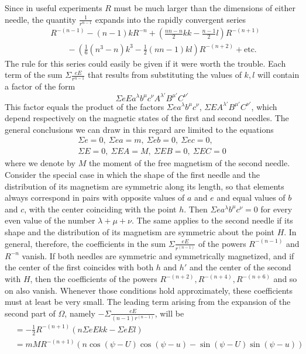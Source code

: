 Since in useful experiments $R$ must be much larger than the dimensions of either needle, the quantity $\frac1{r^{n-1}}$ expands into the rapidly convergent series
\[
\begin{aligned}
&R^{-(n-1)}-(n-1)kR^{-n}+\left(\frac{nn-n}{2}kk-\frac{n-1}{2}l\right)R^{-(n+1)}\\
&\qquad-\left(\tfrac16(n^3-n)k^3-\tfrac12(nn-1)kl\right)R^{-(n+2)}+\text{etc.}
\end{aligned}
\]
The rule for this series could easily be given if it were worth the trouble. Each term of the sum $\Sigma\frac{eE}{r^{n-1}}$ that results from substituting the values of $k,l$ will contain a factor of the form
\[
\Sigma eEa^\lambda b^\mu c^\nu A^{\lambda'}B^{\mu'}C^{\nu'}
\]
This factor equals the product of the factors $\Sigma ea^\lambda b^\mu c^\nu$, $\Sigma EA^{\lambda'}B^{\mu'}C^{\nu'}$, which depend respectively on the magnetic states of the first and second needles. The general conclusions we can draw in this regard are limited to the equations
\[
\begin{gathered}
\Sigma e=0,\ \Sigma ea=m,\ \Sigma eb=0,\ \Sigma ec=0,\\
\Sigma E=0,\ \Sigma EA=M,\ \Sigma EB=0,\ \Sigma EC=0
\end{gathered}
\]
where we denote by $M$ the moment of the free magnetism of the second needle. Consider the special case in which the shape of the first needle and the distribution of its magnetism are symmetric along its length, so that elements always correspond in pairs with opposite values of $a$ and $e$ and equal values of $b$ and $c$, with the center coinciding with the point $h$. Then $\Sigma ea^\lambda b^\mu c^\nu=0$ for every even value of the number $\lambda+\mu+\nu$. The same applies to the second needle if its shape and the distribution of its magnetism are symmetric about the point $H$. In general, therefore, the coefficients in the sum $\Sigma\frac{eE}{r^{(n-1)}}$ of the powers $R^{-(n-1)}$ and $R^{-n}$ vanish. If both needles are symmetric and symmetrically magnetized, and if the center of the first coincides with both $h$ and $h'$ and the center of the second with $H$, then the coefficients of the powers $R^{-(n+2)},R^{-(n+4)},R^{-(n+6)}$ and so on also vanish. Whenever those conditions hold approximately, these coefficients must at least be very small. The leading term arising from the expansion of the second part of $\Omega$, namely $-\Sigma\frac{eE}{(n-1)r^{(n-1)}}$, will be
\[
\begin{aligned}
&=-\tfrac12 R^{-(n+1)}(n\Sigma eEkk-\Sigma eEl)\\
&=mMR^{-(n+1)}(n\cos(\psi-U)\cos(\psi-u)-\sin(\psi-U)\sin(\psi-u))
\end{aligned}
\]

